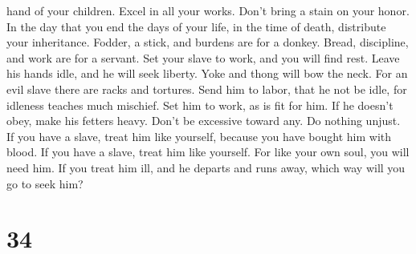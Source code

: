hand of your children.  Excel in all your works. Don't
bring a stain on your honor.  In the day that you end the
days of your life, in the time of death, distribute your inheritance.
 Fodder, a stick, and burdens are for a donkey. Bread,
discipline, and work are for a servant.  Set your slave
to work, and you will find rest. Leave his hands idle, and he will seek
liberty.  Yoke and thong will bow the neck. For an evil
slave there are racks and tortures.  Send him to labor,
that he not be idle, for idleness teaches much mischief. 
Set him to work, as is fit for him. If he doesn't obey, make his fetters
heavy.  Don't be excessive toward any. Do nothing unjust.
 If you have a slave, treat him like yourself, because
you have bought him with blood.  If you have a slave,
treat him like yourself. For like your own soul, you will need him. If
you treat him ill, and he departs and runs away,  which
way will you go to seek him?

\hypertarget{section-29}{%
\section{34}\label{section-29}}

